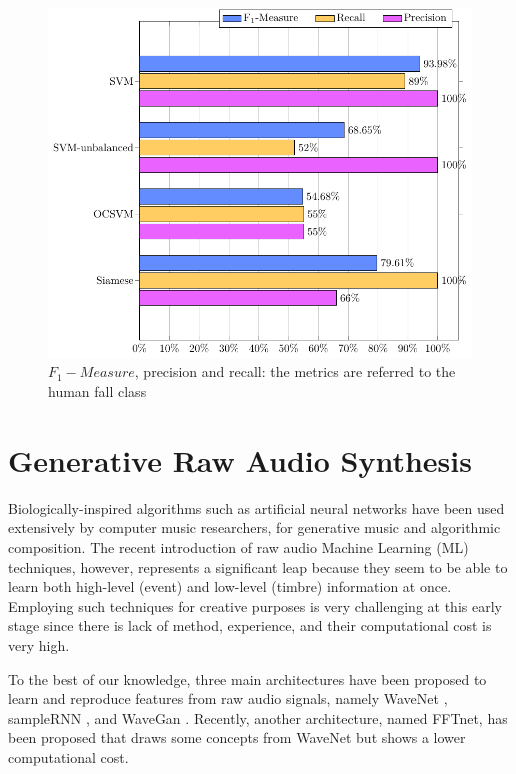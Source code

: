 \begin{figure}[h]
	\centering
	\includegraphics[width=0.65\linewidth]{img/results_f1}
	\caption[Siamese Nets for Human-Fall Detection - Results]{$F_1 -Measure$, precision and recall: the metrics are referred to the human fall class}
	\label{fig:results_f1}
\end{figure}


\newpage

\section{Generative Raw Audio Synthesis}
Biologically-inspired algorithms such as artificial neural networks have been used extensively by computer music researchers, for generative music and algorithmic composition. The recent introduction of raw audio Machine Learning (ML) techniques, however, represents a significant leap because they seem to be able to learn both high-level (event) and low-level (timbre) information at once. Employing such techniques for creative purposes is very challenging at this early stage since there is lack of method, experience, and their computational cost is very high. 

To the best of our knowledge, three main architectures have been proposed to learn and reproduce features from raw audio signals, namely WaveNet \cite{van2016wavenet}, sampleRNN \cite{mehri2016samplernn}, and WaveGan \cite{donahue2018synthesizing}. Recently, another architecture, named FFTnet, has been proposed \cite{jin2018fftnet} that draws some concepts from WaveNet but shows a lower computational cost. 

